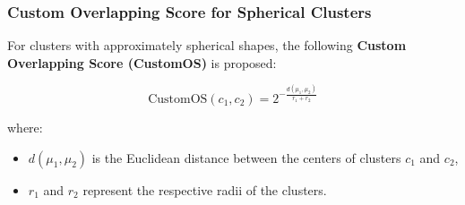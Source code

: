 \subsubsection*{Custom Overlapping Score for Spherical Clusters}

For clusters with approximately spherical shapes, the following \textbf{Custom
      Overlapping Score (CustomOS)} is proposed:

\begin{equation}\label{eq:custom_os}
      \text{CustomOS}(c_1, c_2) = 2^{- \frac{d(\mu_1, \mu_2)}{r_1 + r_2}}
\end{equation}

where:
\begin{itemize}
      \item $ d(\mu_1, \mu_2) $ is the Euclidean distance between the centers of clusters $ c_1 $ and $ c_2 $,
      \item $ r_1 $ and $ r_2 $ represent the respective radii of the clusters.
\end{itemize}


